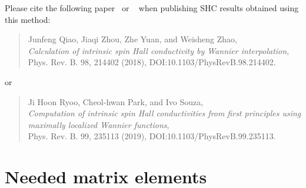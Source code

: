 Please cite the following paper~\cite{qiao-prb2018} or ~\cite{ryoo-prb2019} when publishing SHC results obtained using this method:
\begin{quote}
	Junfeng Qiao, Jiaqi Zhou, Zhe Yuan, and Weisheng Zhao, \\
	\emph{Calculation of intrinsic spin Hall conductivity by Wannier interpolation},\\
	Phys. Rev. B. 98, 214402 (2018), DOI:10.1103/PhysRevB.98.214402.
\end{quote}
or
\begin{quote}
	Ji Hoon Ryoo, Cheol-hwan Park, and Ivo Souza, \\
	\emph{Computation of intrinsic spin Hall conductivities from first principles using maximally localized Wannier functions},\\
	Phys. Rev. B. 99, 235113 (2019), DOI:10.1103/PhysRevB.99.235113.
\end{quote}

\section{Needed matrix elements}


